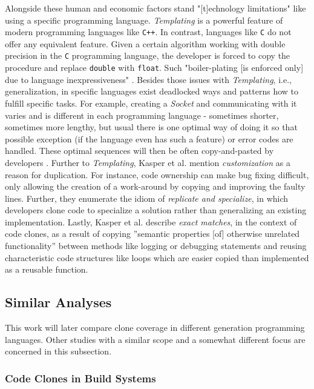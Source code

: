 Alongside these human and economic factors stand "[t]echnology limitations" \cite{kasper2006cloning} like using a specific programming language.
\textit{Templating} is a powerful feature of modern programming languages like \texttt{C++}. In contrast, languages like \texttt{C} do not offer any equivalent feature.
Given a certain algorithm working with double precision in the \texttt{C} programming language, the developer is forced to copy the procedure and replace \texttt{double} with \texttt{float}. Such "boiler-plating [is enforced only] due to language inexpressiveness" \cite{kasper2006cloning}. 
Besides those issues with \textit{Templating}, i.e., generalization, in specific languages exist deadlocked ways and patterns how to fulfill specific tasks.
For example, creating a \textit{Socket} and communicating with it varies and is different in each programming language - sometimes shorter, sometimes more lengthy, but usual there is one optimal way of doing it so that possible exception (if the language even has such a feature) or error codes are handled. These optimal sequences will then be often copy-and-pasted by developers \cite{kasper2006cloning}.
Further to \textit{Templating}, Kasper et al.  \cite{kasper2006cloning} mention \textit{customization} as a reason for duplication.
For instance, code ownership can make bug fixing difficult, only allowing the creation of a work-around by copying and improving the faulty lines.
Further, they enumerate the idiom of \textit{replicate and specialize}, in which developers clone code to specialize a solution rather than generalizing an existing implementation.
Lastly, Kasper et al. \cite{kasper2006cloning} describe \textit{exact matches}, in the context of code clones, as a result of copying ”semantic properties [of] otherwise unrelated functionality” \cite{kasper2006cloning} between methods like logging or debugging statements and reusing characteristic code structures like loops which are easier copied than implemented as a reusable function.

\subsection{Similar Analyses}
\label{sec:similiar_analyses}

This work will later compare clone coverage in different generation programming languages. Other studies with a similar scope and a somewhat different focus are concerned in this subsection.

\subsubsection{Code Clones in Build Systems}

